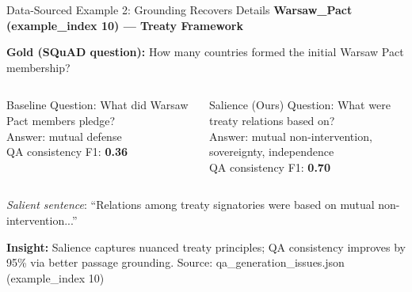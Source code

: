 \documentclass[aspectratio=169]{beamer}
\begin{document}
\begin{frame}{Data-Sourced Example 2: Grounding Recovers Details}
\small
\textbf{Warsaw\_Pact (example\_index 10) — Treaty Framework}

\scriptsize \textbf{Gold (SQuAD question):} How many countries formed the initial Warsaw Pact membership?

\vspace{0.3em}
\begin{columns}[T,onlytextwidth]
\begin{block}{Baseline}
Question: What did Warsaw Pact members pledge? \\
Answer: mutual defense \\
QA consistency F1: \textbf{0.36}
\end{block}

\begin{alertblock}{Salience (Ours)}
Question: What were treaty relations based on? \\
Answer: mutual non-intervention, sovereignty, independence \\
QA consistency F1: \textbf{0.70}
\end{alertblock}
\end{columns}

\vspace{0.3em}
\scriptsize \textit{Salient sentence}: ``Relations among treaty signatories were based on mutual non-intervention...''

\vspace{0.2em}
\textbf{Insight:} Salience captures nuanced treaty principles; QA consistency improves by 95\% via better passage grounding.
\scriptsize Source: qa\_generation\_issues.json (example\_index 10)
\end{frame}
\end{document}
